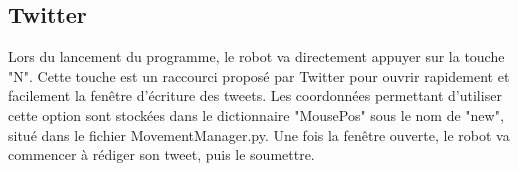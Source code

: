 \subsection{Twitter}

Lors du lancement du programme, le robot va directement appuyer sur la touche "N".
Cette touche est un raccourci proposé par Twitter pour ouvrir rapidement et facilement la fenêtre d'écriture des tweets.
Les coordonnées permettant d'utiliser cette option sont stockées dans le dictionnaire "MousePos" sous le nom de "new", situé dans le fichier MovementManager.py.
Une fois la fenêtre ouverte, le robot va commencer à rédiger son tweet, puis le soumettre.

